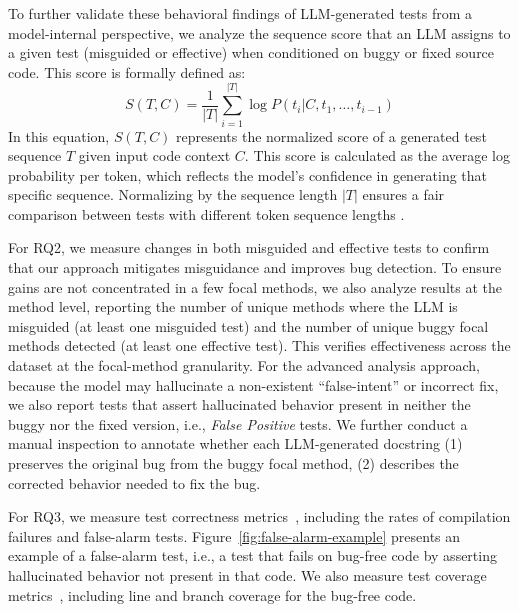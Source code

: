\documentclass[acmsmall]{acmart}
\begin{document}
To further validate these behavioral findings of LLM-generated tests from a model-internal perspective, we analyze the sequence score \cite{LMareFew-Shot-Learner, DetectGPT, Holtzman2020TheCuriousCase} that an LLM assigns to a given test (misguided or effective) when conditioned on buggy or fixed source code. This score is formally defined as:
\begin{equation}
\label{eq:normalized_sequence_score}
S(T, C) = \frac{1}{|T|} \sum_{i=1}^{|T|} \log P(t_i | C, t_1, \ldots, t_{i-1})
\end{equation}
In this equation, $S(T, C)$ represents the normalized score of a generated test sequence $T$ given input code context $C$. This score is calculated as the average log probability per token, which reflects the model's confidence in generating that specific sequence. Normalizing by the sequence length $|T|$ ensures a fair comparison between tests with different token sequence lengths \cite{LMareFew-Shot-Learner}. 

For RQ2, we measure changes in both misguided and effective tests to confirm that our approach mitigates misguidance and improves bug detection. To ensure gains are not concentrated in a few focal methods, we also analyze results at the method level, reporting the number of unique methods where the LLM is misguided (at least one misguided test) and the number of unique buggy focal methods detected (at least one effective test). This verifies effectiveness across the dataset at the focal-method granularity. 
For the advanced analysis approach, because the model may hallucinate a non-existent ``false-intent'' or incorrect fix, we also report tests that assert hallucinated behavior present in neither the buggy nor the fixed version, i.e., \emph{False Positive} tests. We further conduct a manual inspection to annotate whether each LLM-generated docstring (1) preserves the original bug from the buggy focal method, (2) describes the corrected behavior needed to fix the bug.

For RQ3, we measure test correctness metrics~\cite{OnLLMUTGenEvalASE2024, EvalImprChatgptUTGenFSE2024, EmpEvalforLLMUTAutoGenTSE}, including the rates of compilation failures and false-alarm tests. Figure~\ref{fig:false-alarm-example} presents an example of a false-alarm test, i.e., a test that fails on bug-free code by asserting hallucinated behavior not present in that code. We also measure test coverage metrics~\cite{HITS:HighCoveLLMUTGen, CovNotStronglyCorrWithEffICSE2014, CAT-LMASE2023}, including line and branch coverage for the bug-free code.
\end{document}
